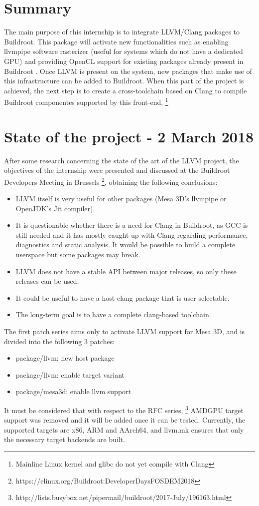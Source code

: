 \documentclass[12pt,a4paper,oneside]{article}
\begin{document}
\section*{Summary}
The main purpose of this internship is to integrate LLVM/Clang packages to Buildroot.
This package will activate new functionalities such as enabling llvmpipe software
rasterizer (useful for systems which do not have a dedicated GPU) and providing OpenCL
support for existing packages already present in Buildroot . Once LLVM is present
on the system, new packages that make use of this infrastructure can be added to
Buildroot. When this part of the project is achieved, the next step is to create
a cross-toolchain based on Clang to compile Buildroot componentes supported by
this front-end. \footnote{Mainline Linux kernel and glibc do not yet compile with
Clang}

\section*{State of the project - 2 March 2018}
After some research concerning the state of the art of the LLVM project, the objectives
of the internship were presented and discussed at the Buildroot Developers Meeting
in Brussels \footnote{https://elinux.org/Buildroot:DeveloperDaysFOSDEM2018}, obtaining
the following conclusions:
\begin{itemize}
  \item LLVM itself is very useful for other packages (Mesa 3D's llvmpipe or OpenJDK's
        Jit compiler).
  \item It is questionable whether there is a need for Clang in Buildroot, as GCC
        is still needed and it has mostly caught up with Clang regarding performance,
        diagnostics and static analysis. It would be possible to build a complete
        userspace but some packages may break.
  \item LLVM does not have a stable API between major releases, so only these releases
        can be used.
  \item It could be useful to have a host-clang package that is user selectable.
  \item The long-term goal is to have a complete clang-based toolchain.
\end{itemize}
The first patch series aims only to activate LLVM support for Mesa 3D, and is divided
into the following 3 patches:
\begin{itemize}
  \item package/llvm: new host package
  \item package/llvm: enable target variant
  \item package/mesa3d: enable llvm support
\end{itemize}
It must be considered that with respect to the RFC series,
\footnote{http://lists.busybox.net/pipermail/buildroot/2017-July/196163.html}
AMDGPU target support was removed and it will be added once it can be tested.
Currently, the supported targets are x86, ARM and AArch64, and llvm.mk ensures
that only the necessary target backends are built.
\end{document}
